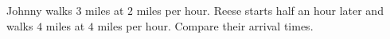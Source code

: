 Johnny walks $3$ miles at $2$ miles per hour. Reese starts half an hour later and walks $4$ miles at $4$ miles per hour. Compare their arrival times.
